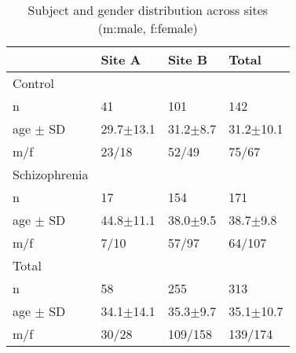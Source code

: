 \begin{table}[htbp]
  \centering
  \caption{Subject and gender distribution across sites (m:male, f:female)}
    \begin{tabular}{l|lll}
    \toprule
     & \textbf{Site A} & \textbf{Site B} &\textbf{Total} \\
    \midrule
    Control \\
    \hspace{1em}n &41 &101 &142 \\
    \hspace{1em}age $\pm$ SD    &29.7$\pm$13.1 &31.2$\pm$8.7 & 31.2$\pm$10.1	  \\
    \hspace{1em}m/f   & 23/18 & 52/49 & 75/67\\
     Schizophrenia\\
     \hspace{1em}n &17 &154 &171 \\
     \hspace{1em}age $\pm$ SD    &44.8$\pm$11.1 &38.0$\pm$9.5	 & 38.7$\pm$9.8  \\
     \hspace{1em}m/f   & 7/10 & 57/97 & 64/107\\
     Total \\
     \hspace{1em}n &58 &255 &313 \\
     \hspace{1em}age $\pm$ SD    & 34.1$\pm$14.1&	35.3$\pm$9.7 & 35.1$\pm$10.7\\
    \hspace{1em}m/f   & 30/28 & 109/158 & 139/174\\
    \bottomrule
    \end{tabular}%
  \label{tab:cohort}%
\end{table}

